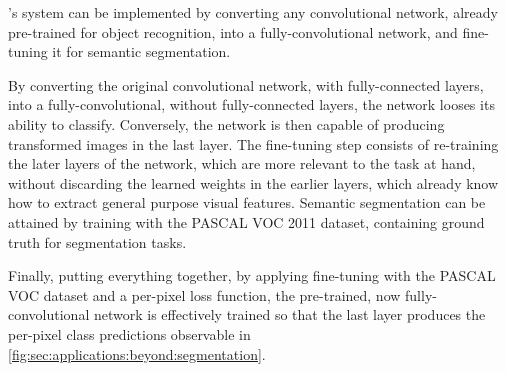 \citeauthor{Long2015}'s system can be implemented by converting any convolutional network, already pre-trained for object recognition, into a fully-convolutional network, and fine-tuning it for semantic segmentation.

By converting the original convolutional network, with fully-connected layers, into a fully-convolutional, without fully-connected layers, the network looses its ability to classify.
Conversely, the network is then capable of producing transformed images in the last layer.
The fine-tuning step consists of re-training the later layers of the network, which are more relevant to the task at hand, without discarding the learned weights in the earlier layers, which already know how to extract general purpose visual features.
Semantic segmentation can be attained by training with the PASCAL VOC 2011 dataset, containing ground truth for segmentation tasks.

Finally, putting everything together, by applying fine-tuning with the PASCAL VOC dataset and a per-pixel loss function, the pre-trained, now fully-convolutional network is effectively trained so that the last layer produces the per-pixel class predictions observable in \autoref{fig:sec:applications:beyond:segmentation}.
